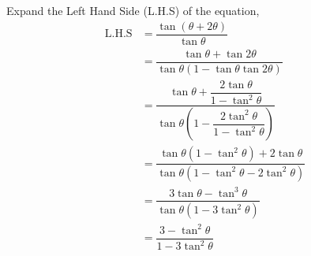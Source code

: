 \begin{solution}[\halfpage]
  Expand the Left Hand Side (L.H.S) of the equation,
  \begin{align}
    \text{L.H.S} &= \dfrac{\tan(\theta+2\theta)}{\tan\theta} \\
                 &= \dfrac{\tan\theta+\tan2\theta}
                          {\tan\theta(1-\tan\theta\tan2\theta)} \\
                 &= \dfrac{\tan\theta+\dfrac{2\tan\theta}{1-\tan^2\theta}}
                          {\tan\theta
                            \left(1-\dfrac{2\tan^2\theta}
                                          {1-\tan^2\theta}\right)} \\
                 &= \dfrac{\tan\theta(1-\tan^2\theta)+2\tan\theta}
                          {\tan\theta(1-\tan^2\theta-2\tan^2\theta)} \\
				 &= \dfrac{3\tan\theta-\tan^3\theta}
				          {\tan\theta(1-3\tan^2\theta)} \\
				 &= \dfrac{3-\tan^2\theta}{1-3\tan^2\theta}
  \end{align}

\end{solution}
